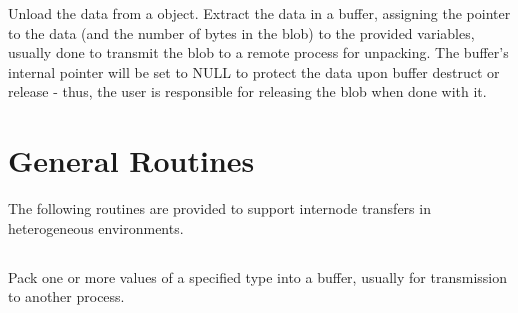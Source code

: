 Unload the data from a  object.
Extract the data in a buffer, assigning the pointer to the data (and the number of bytes in the blob) to the provided variables, usually done to transmit the blob to a remote process for unpacking. The buffer's internal pointer will be set to NULL to protect the data upon buffer destruct or release - thus, the user is responsible for releasing the blob when done with it.


\begin{arglist}
\end{arglist}


\section{General Routines}
\label{chap:data_mgmt:general}

The following routines are provided to support internode transfers in heterogeneous environments.

\subsection{}

\summary

Pack one or more values of a specified type into a buffer, usually for transmission to another process.

\format


